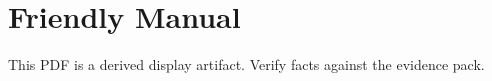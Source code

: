 \documentclass[11pt]{article}
\begin{document}
\section*{Friendly Manual}

This PDF is a derived display artifact. Verify facts against the evidence pack.
\end{document}
